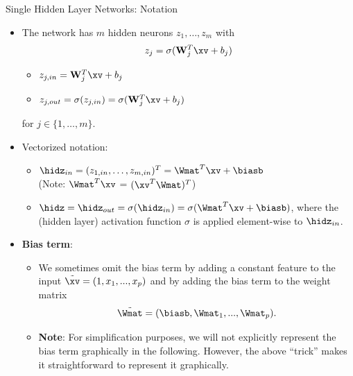 \documentclass[11pt,compress,t,notes=noshow, xcolor=table]{beamer}
\begin{document}
\begin{vbframe}{Single Hidden Layer Networks: Notation}
  \begin{itemize}
    \vspace{4mm}
    \item The network has $m$ hidden neurons $z_1, \dots, z_m$ with
    $$ z_j = \sigma(\mathbf{W}_j^T \xv + b_j)$$
    \vspace{-0.5cm}
    \begin{itemize}
    \item $z_{j,in}  = \mathbf{W}_j^T \xv + b_j$
    \vspace{2mm}
    \item $z_{j,out} = \sigma(z_{j,in}) = \sigma(\mathbf{W}_j^T \xv + b_j)$
    \end{itemize}
    \vspace{4mm}
    for $j \in \{1,\ldots,m\}$.
    \vspace{4mm}

\item Vectorized notation:
\begin{itemize}
\item $ \hidz_{in} = (z_{1,in}, \dots, z_{m,in})^T = \Wmat^T \xv + \biasb$ \\ (Note: $\Wmat^T \xv$ = $(\xv^T \Wmat)^T$)
\item $ \hidz = \hidz_{out} = \sigma(\hidz_{in}) = \sigma(\Wmat^T \xv + \biasb)$, where the (hidden layer) activation function $\sigma$ is applied element-wise to $\hidz_{in}$.  
\end{itemize}
\framebreak
\item \textbf{Bias term}:         
\begin{itemize}
\item We sometimes omit the bias term by adding a constant feature to the input $\tilde{\xv} = (1, x_1, ..., x_p)$ and by adding the bias term to the weight matrix 
$$\tilde{\Wmat} = (\biasb, \Wmat_1, ..., \Wmat_p).$$ 
\item \textbf{Note}: For simplification purposes, we will not explicitly represent the bias term graphically in the following. However, the above \enquote{trick} makes it straightforward to represent it graphically. 
\end{itemize}
\end{itemize}
\framebreak


\end{vbframe}
\end{document}

